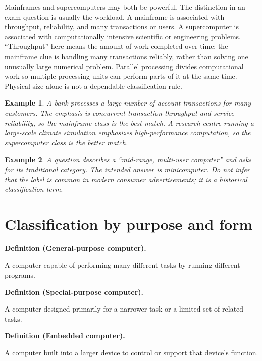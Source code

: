\documentclass[11pt]{article}
\newtheorem{example}{Example}[section]
\newenvironment{definitionbox}[1]{%
  \par\noindent\textbf{Definition (#1).}\ \itshape
}{\par\vspace{0.3em}}
\begin{document}
Mainframes and supercomputers may both be powerful. The distinction in an
exam question is usually the workload. A mainframe is associated with
throughput, reliability, and many transactions or users. A supercomputer is
associated with computationally intensive scientific or engineering
problems. ``Throughput'' here means the amount of work completed over time;
the mainframe clue is handling many transactions reliably, rather than
solving one unusually large numerical problem. Parallel processing divides
computational work so multiple processing units can perform parts of it at
the same time. Physical size alone is not a dependable classification rule.

\begin{example}
A bank processes a large number of account transactions for many customers.
The emphasis is concurrent transaction throughput and service reliability,
so the mainframe class is the best match. A research centre running a
large-scale climate simulation emphasizes high-performance computation, so
the supercomputer class is the better match.
\end{example}

\begin{example}
A question describes a ``mid-range, multi-user computer'' and asks for its
traditional category. The intended answer is minicomputer. Do not infer that
the label is common in modern consumer advertisements; it is a historical
classification term.
\end{example}

\section{Classification by purpose and form}
\begin{definitionbox}{General-purpose computer}
A computer capable of performing many different tasks by running different
programs.
\end{definitionbox}

\begin{definitionbox}{Special-purpose computer}
A computer designed primarily for a narrower task or a limited set of
related tasks.
\end{definitionbox}

\begin{definitionbox}{Embedded computer}
A computer built into a larger device to control or support that device's
function.
\end{definitionbox}
\end{document}
